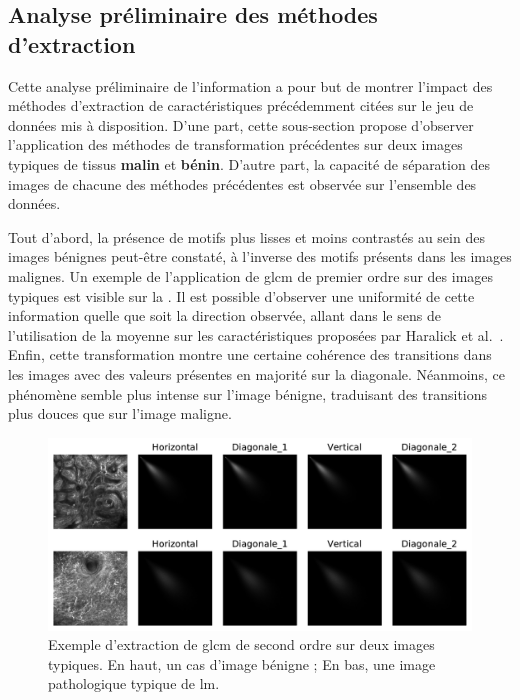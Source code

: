\subsection{Analyse préliminaire des méthodes d'extraction}
Cette analyse préliminaire de l'information a pour but de montrer l'impact des méthodes d'extraction de caractéristiques précédemment citées sur le jeu de données mis à disposition. D'une part, cette sous-section propose d'observer l'application des méthodes de transformation précédentes sur deux images typiques de tissus \textbf{malin} et \textbf{bénin}. D'autre part, la capacité de séparation des images de chacune des méthodes précédentes est observée sur l'ensemble des données.\par

Tout d'abord, la présence de motifs plus lisses et moins contrastés au sein des images bénignes peut-être constaté, à l'inverse des motifs présents dans les images malignes. Un exemple de l'application de \gls{glcm} de premier ordre sur des images typiques est visible sur la . Il est possible d'observer une uniformité de cette information quelle que soit la direction observée, allant dans le sens de l'utilisation de la moyenne sur les caractéristiques proposées par Haralick et al.~\cite{Wiltgen2008}. Enfin, cette transformation montre une certaine cohérence des transitions dans les images avec des valeurs présentes en majorité sur la diagonale. Néanmoins, ce phénomène semble plus intense sur l'image bénigne, traduisant des transitions plus douces que sur l'image maligne.\par

\begin{figure}[H]
    \centering
    \includegraphics[width=\linewidth]{contents/chapter_5/resources/example_glcm.pdf}
    \caption{Exemple d'extraction de \gls{glcm} de second ordre sur deux images typiques. En haut, un cas d'image bénigne ; En bas, une image pathologique typique de \gls{lm}.}
    \label{fig:example_glcm}
\end{figure}\par

